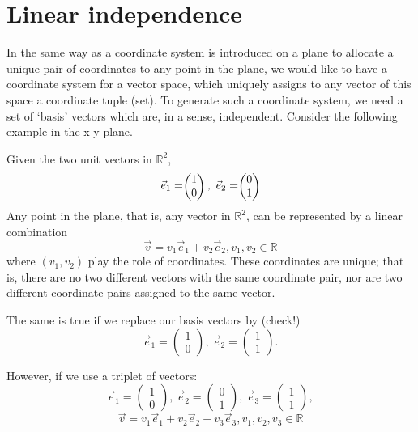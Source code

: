 \documentclass[
  a4paper,
  DIV=11,
  numbers=noendperiod,
  oneside]{scrreprt}
\theoremstyle{definition}
\theoremstyle{remark}
\begin{document}
\section{Linear independence}\label{linear-independence}

In the same way as a coordinate system is introduced on a plane to
allocate a unique pair of coordinates to any point in the plane, we
would like to have a coordinate system for a vector space, which
uniquely assigns to any vector of this space a coordinate tuple (set).
To generate such a coordinate system, we need a set of `basis' vectors
which are, in a sense, independent. Consider the following example in
the x-y plane.

Given the two unit vectors in \(\mathbb{R}^2\),
\[\vec{e}_1 = \scriptstyle \begin{pmatrix}   1 \\ 0  \end{pmatrix} \textstyle, \ \vec{e}_2= \scriptstyle \begin{pmatrix}   0 \\ 1  \end{pmatrix} \textstyle\]
Any point in the plane, that is, any vector in \(\mathbb{R}^2\), can be
represented by a linear combination
\[\vec{v } = v_1  \vec{e}_1  + v_2  \vec{e}_2,  v_1,v_2 \in \mathbb{R}\]
where \((v_1,v_2)\) play the role of coordinates. These coordinates are
unique; that is, there are no two different vectors with the same
coordinate pair, nor are two different coordinate pairs assigned to the
same vector.

The same is true if we replace our basis vectors by (check!)
\[\vec{e}_1 = \scriptstyle \begin{pmatrix}   1 \\ 0  \end{pmatrix} \textstyle, \ \vec{e}_2= \scriptstyle \begin{pmatrix}   1 \\ 1  \end{pmatrix} \textstyle .\]

However, if we use a triplet of vectors:
\[\vec{e}_1 = \scriptstyle \begin{pmatrix}   1 \\ 0  \end{pmatrix} \textstyle, \ \vec{e}_2= \scriptstyle \begin{pmatrix}   0 \\ 1  \end{pmatrix} \textstyle,  \ \vec{e}_3= \scriptstyle \begin{pmatrix}   1 \\ 1  \end{pmatrix} \textstyle ,\]
\[\vec{v } = v_1  \vec{e}_1  + v_2  \vec{e}_2 + v_3  \vec{e}_3 ,  v_1,v_2,v_3 \in \mathbb{R}\]
\end{document}
